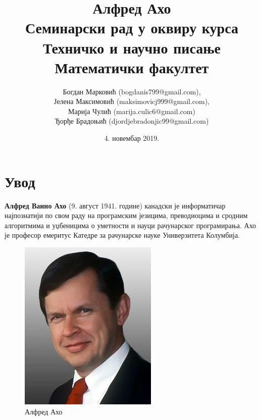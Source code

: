 \documentclass[a4paper]{article}
\begin{document}
\title{Алфред Ахо\\ \small{Семинарски рад у оквиру курса\\Техничко и научно писање\\Математички факултет}}

\author{Богдан Марковић (bogdanis799@gmail.com),\\Јелена Максимовић (maksimovicj999@gmail.com),\\ Марија Чулић (marija.culic6@gmail.com)\\ Ђорђе Брадоњић (djordjebradonjic99@gmail.com)\\}
\date{4. новембар 2019.}
\maketitle

\tableofcontents

\newpage

\section{Увод}
\label{sec:uvod}
\textbf{Алфред Ваино Ахо} (9. август 1941. године) канадски је информатичар најпознатији по свом раду на програмским језицима, преводиоцима и сродним алгоритмима и уџбеницима о уметности и науци рачунарског програмирања. Ахо је професор емеритус Катедре за рачунарске науке Универзитета Колумбија.

\begin{figure}[h!]
\begin{center}
\includegraphics[scale=1.75]{AlfredAhoPortrait.jpg}
\end{center}
\caption{Алфред Ахо}
\end{figure}
\end{document}
